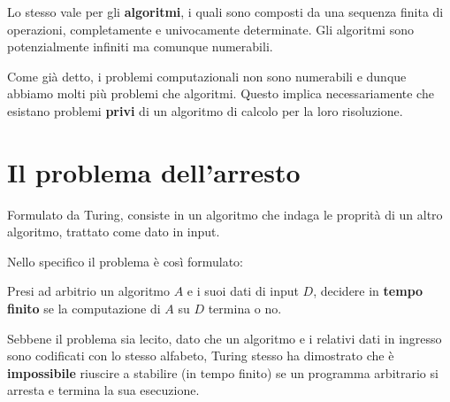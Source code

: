 Lo stesso vale per gli \textbf{algoritmi}, i quali sono composti da una sequenza finita di operazioni, completamente
e univocamente determinate. Gli algoritmi sono potenzialmente infiniti ma comunque numerabili.

Come gi\`a detto, i problemi computazionali non sono numerabili e dunque abbiamo molti pi\`u problemi che algoritmi.
Questo implica necessariamente che esistano problemi \textbf{privi} di un algoritmo di calcolo per la loro risoluzione.

\section{Il problema dell'arresto}\label{arresto}
Formulato da Turing, consiste in un algoritmo che indaga le proprit\`a di un altro algoritmo, trattato come dato in
input.

Nello specifico il problema \`e cos\`i formulato:
\begin{center}
	Presi ad arbitrio un algoritmo $A$ e i suoi dati di input $D$, decidere in \textbf{tempo finito} se la computazione
	di $A$ su $D$ termina o no.
\end{center}

Sebbene il problema sia lecito, dato che un algoritmo e i relativi dati in ingresso sono codificati con lo stesso
alfabeto, Turing stesso ha dimostrato che \`e \textbf{impossibile} riuscire a stabilire (in tempo finito) se un
programma arbitrario si arresta e termina la sua esecuzione.

